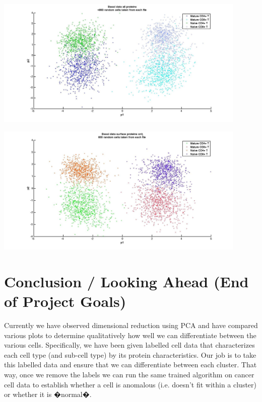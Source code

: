 \documentclass{article} %
\begin{document}
\begin{minipage}{\linewidth}
\centering
  \includegraphics[width=120mm]{Basal_AllProtein_TCells.jpg}
\end{minipage}

\begin{minipage}{\linewidth}
\centering
  \includegraphics[width=120mm]{Basal_SurfaceProtein_TCells.jpg}
\end{minipage}

\section{Conclusion / Looking Ahead (End of Project Goals)}
Currently we have observed dimensional reduction using PCA and have compared various plots to determine qualitatively how well we can differentiate between the various cells. Specifically, we have been given labelled cell data that characterizes each cell type (and sub-cell type) by its protein characteristics. Our job is to take this labelled data and ensure that we can differentiate between each cluster. That way, once we remove the labels we can run the same trained algorithm on cancer cell data to establish whether a cell is anomalous (i.e. doesn't fit within a cluster) or whether it is �normal�. 
\end{document}
